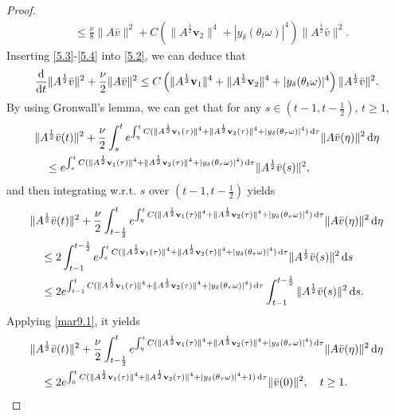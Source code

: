 \documentclass{elsarticle}
\theoremstyle{definition}
\numberwithin{equation}{section}
\renewcommand{\d}{{\rm{d}}}
\begin{document}
\begin{proof}
\begin{align}
&\leq \frac \nu 8\|A\bar{v}\|^2+C\left (\|A^\frac12\textbf{v}_2\|^4+|y_\delta(\theta_t\omega)|^4\right)\|A^\frac12\bar{v}\|^2.
\end{align}
Inserting \eqref{5.3}-\eqref{5.4} into \eqref{5.2}, we can deduce that
\begin{align} \label{mar9.2}
\frac{\d}{\d t}\|A^\frac12\bar{v}\|^2+  \frac{\nu}{2} \|A\bar{v}\|^2
\leq C\left(\|A^\frac12\textbf{v}_1\|^4+\|A^\frac12\textbf{v}_2\|^4+|y_\delta(\theta_t\omega)|^4\right)\|A^\frac12\bar{v}\|^2.
\end{align}
By using Gronwall's lemma, we can get that for any $s\in(t-1, t-\frac 12)$, $t\geq 1$,
\begin{align}
 & \|A^\frac12\bar{v}(t)\|^2
 +  \frac{\nu }{2} \int_s^te^{\int_\eta^tC(\|A^\frac12\textbf{v}_1(\tau)\|^4+\|A^\frac12\textbf{v}_2(\tau)\|^4+|y_\delta(\theta_\tau\omega)|^4)\, \d \tau}\|A\bar{v}(\eta) \|^2 \, \d \eta
\nonumber\\
&\quad \leq e^{ \int_s^tC(\|A^\frac12\textbf{v}_1(\tau) \|^4+\|A^\frac12\textbf{v}_2(\tau)\|^4+|y_\delta(\theta_\tau\omega)|^4)\, \d \tau}\|A^\frac12\bar{v}(s)\|^2, \nonumber
\end{align}
and then integrating w.r.t. $s$ over $(t-1,t-\frac 12)$  yields
\begin{align*}
 & \|A^\frac12\bar{v}(t)\|^2
 + \frac{\nu}{2} \int_{t-\frac 12} ^te^{\int_\eta^tC(\|A^\frac12\textbf{v}_1(\tau)\|^4+\|A^\frac12\textbf{v}_2(\tau)\|^4+|y_\delta(\theta_\tau\omega)|^4)\, \d \tau}\|A\bar{v}(\eta) \|^2 \, \d \eta
\nonumber\\
&\quad \leq  2 \int_{t-1} ^{t-\frac 12}   e^{ \int_s^tC(\|A^\frac12\textbf{v}_1(\tau) \|^4+\|A^\frac12\textbf{v}_2(\tau)\|^4+|y_\delta(\theta_\tau\omega)|^4)\, \d \tau}\|A^\frac12\bar{v}(s)\|^2  \, \d s \\
& \quad \leq  2e^{ \int_{t-1}^tC(\|A^\frac12\textbf{v}_1(\tau) \|^4+\|A^\frac12\textbf{v}_2(\tau)\|^4+|y_\delta(\theta_\tau\omega)|^4)\, \d \tau}  \int_{t-1} ^{t-\frac 12} \|A^\frac12\bar{v}(s)\|^2 \, \d s
.
\end{align*}
Applying \eqref{mar9.1},  it yields
\begin{align}
 & \|A^\frac12\bar{v}(t)\|^2
 + \frac{\nu}{2}\int_{t-\frac 12} ^te^{\int_\eta^tC(\|A^\frac12\textbf{v}_1(\tau)\|^4+\|A^\frac12\textbf{v}_2(\tau)\|^4+|y_\delta(\theta_\tau\omega)|^4)\, \d \tau}\|A\bar{v}(\eta) \|^2 \, \d \eta \nonumber  \\
  &\quad  \leq  2e^{ \int_{0}^tC(\|A^\frac12\textbf{v}_1(\tau) \|^4+\|A^\frac12\textbf{v}_2(\tau)\|^4+|y_\delta(\theta_\tau\omega)|^4+1)\, \d \tau}
   \|\bar{v}(0)\|^2
,\quad t\geq 1. \label{mar19.1}
\end{align}


\end{proof}
\end{document}
